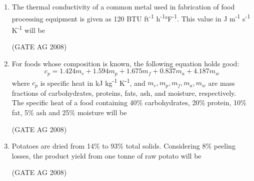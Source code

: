 \documentclass[journal,12pt,onecolumn]{IEEEtran}
\begin{document}
\begin{enumerate}
\item 
 The thermal conductivity of a common metal used in fabrication of food processing equipment is given as 120 BTU ft\textsuperscript{-1} h\textsuperscript{-1}°F\textsuperscript{-1}. This value in J m\textsuperscript{-1} s\textsuperscript{-1} K\textsuperscript{-1} will be
\begin{enumerate}
\end{enumerate}
\hfill(GATE AG 2008)\\

\medskip

\item 
 For foods whose composition is known, the following equation holds good:
\[
c_p = 1.424 m_c + 1.594 m_p + 1.675 m_f + 0.837 m_a + 4.187 m_w
\]
where $c_p$ is specific heat in kJ kg\textsuperscript{-1} K\textsuperscript{-1}, and $m_c, m_p, m_f, m_a, m_w$ are mass fractions of carbohydrates, proteins, fats, ash, and moisture, respectively. \\
The specific heat of a food containing 40\% carbohydrates, 20\% protein, 10\% fat, 5\% ash and 25\% moisture will be
\begin{enumerate}
\end{enumerate}
\hfill(GATE AG 2008)\\

\medskip

\item 
 Potatoes are dried from 14\% to 93\% total solids. Considering 8\% peeling losses, the product yield from one tonne of raw potato will be
\begin{enumerate}
\end{enumerate}
\hfill(GATE AG 2008)\\


\end{enumerate}
\end{document}
